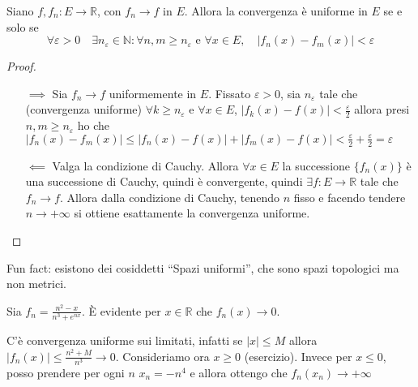 \begin{theorem}
    Siano \(f, f_{n} : E \to \mathbb{R}\), con \(f_{n} \to f\) in \(E\). Allora la
    convergenza è uniforme in \(E\) se e solo se 
    \[
        \forall \varepsilon>0 \quad \exists n_\varepsilon \in \mathbb{N} : \forall n,m
        \ge n_\varepsilon \text{ e } \forall x \in E, \quad |f_{n}(x) -
        f_{m}(x)| < \varepsilon
    \]
\end{theorem}
\begin{proof}\( \)
\begin{itemize}
    \item[\(\implies \)] Sia \(f_{n} \to f\) uniformemente in \(E\). Fissato
        \(\varepsilon>0\), sia \(n_\varepsilon\) tale che (convergenza uniforme)
        \(\forall k \ge n_\varepsilon\) e \(\forall x \in E\), \(|f_k(x) - f(x)|
        < \frac{\varepsilon}{2}\) allora presi \(n,m \ge n_\varepsilon\) ho
        che \(|f_n(x) - f_m(x)| \le |f_n(x) - f(x)| + |f_m(x) - f(x)| <
        \frac{\varepsilon}{2} + \frac{\varepsilon}{2} = \varepsilon\) 
    \item[\(\impliedby \)] Valga la condizione di Cauchy. Allora \(\forall x \in
        E\) la successione \(\{f_{n}(x)\} \) è una successione di Cauchy, quindi
        è convergente, quindi \(\exists f : E \to \mathbb{R}\) tale che
        \(f_{n} \to f\). Allora dalla condizione di Cauchy, tenendo \(n\) fisso
        e facendo tendere \(n \to +\infty\) si ottiene esattamente la
        convergenza uniforme.
\end{itemize}
\end{proof}

Fun fact: esistono dei cosiddetti ``Spazi uniformi'', che sono spazi topologici
ma non metrici.

\begin{example}
    Sia \(f_{n} = \frac{n^2 - x}{n^3 + e^{nx}}\). È evidente per \(x \in
    \mathbb{R}\) che \(f_{n}(x) \to 0\).

    C'è convergenza uniforme sui limitati, infatti se \(|x| \le M\) allora
    \(|f_{n}(x)| \le \frac{n^2 + M}{n^3} \to 0\). Consideriamo ora \(x \ge  0\)
    (esercizio). Invece per \(x \le 0\), posso prendere per ogni \(n\) \(x_{n} =
    -n^{4}\) e allora ottengo che \(f_{n}(x_{n}) \to +\infty\) 
\end{example}

